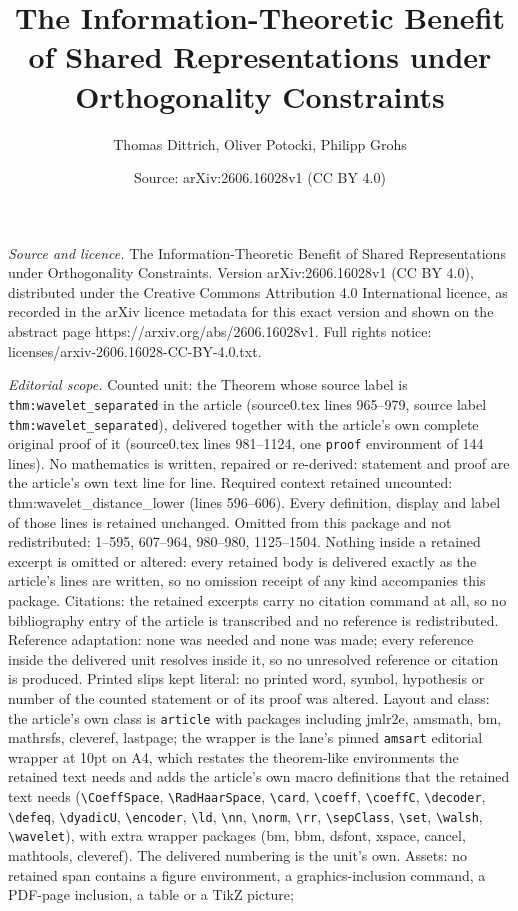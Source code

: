 \documentclass[10pt,a4paper]{amsart}
\title[The Information-Theoretic Benefit of Shared Representations ]{The Information-Theoretic Benefit of Shared Representations under Orthogonality Constraints}
\author{Thomas Dittrich, Oliver Potocki, Philipp Grohs}
\date{Source: arXiv:2606.16028v1 (CC BY 4.0)}
\begin{document}
\maketitle

\noindent\emph{Source and licence.} The Information-Theoretic Benefit of Shared Representations under Orthogonality Constraints. Version arXiv:2606.16028v1 (CC BY 4.0), distributed under the Creative Commons Attribution 4.0 International licence, as recorded in the arXiv licence metadata for this exact version and shown on the abstract page https://arxiv.org/abs/2606.16028v1. Full rights notice: licenses/arxiv-2606.16028-CC-BY-4.0.txt.\par\smallskip

\noindent\textit{Editorial scope.} Counted unit: the Theorem whose source label is \texttt{thm:wavelet\_separated} in the article (source0.tex lines 965--979, source label \texttt{thm:wavelet\_separated}), delivered together with the article's own complete original proof of it (source0.tex lines 981--1124, one \texttt{proof} environment of 144 lines). No mathematics is written, repaired or re-derived: statement and proof are the article's own text line for line. Required context retained uncounted: thm:wavelet\_distance\_lower (lines 596--606). Every definition, display and label of those lines is retained unchanged. Omitted from this package and not redistributed: 1--595, 607--964, 980--980, 1125--1504. Nothing inside a retained excerpt is omitted or altered: every retained body is delivered exactly as the article's lines are written, so no omission receipt of any kind accompanies this package. Citations: the retained excerpts carry no citation command at all, so no bibliography entry of the article is transcribed and no reference is redistributed. Reference adaptation: none was needed and none was made; every reference inside the delivered unit resolves inside it, so no unresolved reference or citation is produced. Printed slips kept literal: no printed word, symbol, hypothesis or number of the counted statement or of its proof was altered. Layout and class: the article's own class is \texttt{article} with packages including jmlr2e, amsmath, bm, mathrsfs, cleveref, lastpage; the wrapper is the lane's pinned \texttt{amsart} editorial wrapper at 10pt on A4, which restates the theorem-like environments the retained text needs and adds the article's own macro definitions that the retained text needs (\texttt{\textbackslash CoeffSpace}, \texttt{\textbackslash RadHaarSpace}, \texttt{\textbackslash card}, \texttt{\textbackslash coeff}, \texttt{\textbackslash coeffC}, \texttt{\textbackslash decoder}, \texttt{\textbackslash defeq}, \texttt{\textbackslash dyadicU}, \texttt{\textbackslash encoder}, \texttt{\textbackslash ld}, \texttt{\textbackslash nn}, \texttt{\textbackslash norm}, \texttt{\textbackslash rr}, \texttt{\textbackslash sepClass}, \texttt{\textbackslash set}, \texttt{\textbackslash walsh}, \texttt{\textbackslash wavelet}), with extra wrapper packages (bm, bbm, dsfont, xspace, cancel, mathtools, cleveref). The delivered numbering is the unit's own. Assets: no retained span contains a figure environment, a graphics-inclusion command, a PDF-page inclusion, a table or a TikZ picture; 
\end{document}
